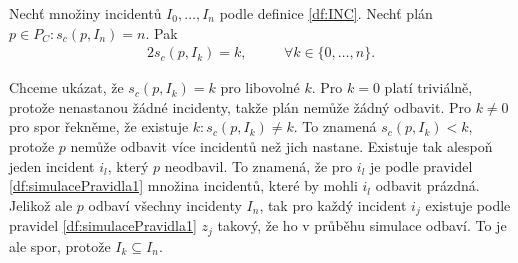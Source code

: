 \begin{veta}\label{veta:OmeneIncidentech}
  Nechť množiny incidentů $I_0, \dots, I_n$ podle definice \ref{df:INC}.
  Nechť plán $p \in P_C \colon s_c(p, I_n) = n$. Pak
  \begin{alignat*}{2}
    s_c(p, I_k) = k, \quad && \forall k \in \{ 0, \dots, n \}.
  \end{alignat*}
\end{veta}
\begin{dukaz}
  Chceme ukázat, že $s_c(p, I_k) = k$ pro libovolné $k$.
  Pro $k = 0$ platí triviálně, protože nenastanou žádné incidenty, takže plán nemůže žádný odbavit.
  Pro $k \neq 0$ pro spor řekněme, že existuje $k \colon s_c(p, I_k) \neq k$.
  To znamená $s_c(p, I_k) < k$, protože $p$ nemůže odbavit více incidentů než jich nastane.
  Existuje tak alespoň jeden incident $i_l$, který $p$ neodbavil.
  To znamená, že pro $i_l$ je podle pravidel \ref{df:simulacePravidla1} množina incidentů, které by mohli $i_l$ odbavit prázdná.
  Jelikož ale $p$ odbaví všechny incidenty $I_n$, tak pro každý incident $i_j$ existuje podle pravidel \ref{df:simulacePravidla1} $z_j$ takový, že ho v průběhu simulace odbaví.
  To je ale spor, protože $I_k \subseteq I_n$.
\end{dukaz}
%

